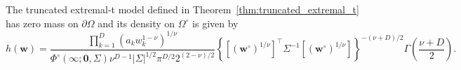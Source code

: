 \documentclass[lineno]{biometrika}
\begin{document}
%
\begin{proposition}
\label{prop:AngDesn_eT}
The truncated extremal-t model defined in Theorem~\ref{thm:truncated_extremal_t} has zero mass on $\partial\Omega$ and its density on $\Omega^\circ$ is given by
%
\begin{equation}
\label{eq:h_eT}
h(\bm w) = \frac{\prod_{k=1}^D \left(a_k w_k^{1-\nu}\right)^{1/\nu}}{\Phi^\circ(\bm \infty;\bm 0, \Sigma) \nu^{D-1}|\Sigma|^{1/2}\pi^{D/2}2^{(2-\nu)/2}} \left\{\left[(\bm w^\circ)^{1/\nu}\right]^\top \Sigma^{-1}\left[(\bm w^\circ)^{1/\nu}\right]\right\}^{-(\nu+D)/2} \Gamma\left(\frac{\nu+D}{2}\right).
\end{equation}%
\end{proposition}

\end{document}
